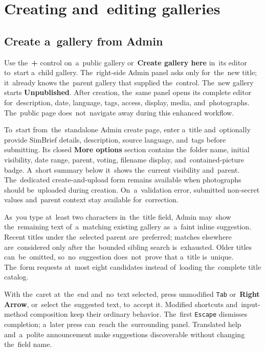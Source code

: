 \documentclass[11pt,a4paper]{article}
\newcommand{\ui}[1]{\textbf{#1}}
\newcommand{\codeword}[1]{\nolinkurl{#1}}
\begin{document}
\section{Creating and~editing galleries}
\label{sec:create-edit-gallery}

\subsection{Create a~gallery from Admin}

Use the~\ui{+} control on~a~public gallery or~\ui{Create gallery here} in~its
editor to~start a~child gallery. The~right-side Admin panel asks only
for~the~new title; it~already knows the~parent gallery that supplied
the~control. The~new gallery starts \ui{Unpublished}. After creation, the~same
panel opens its complete editor for~description, date, language, tags, access,
display, media, and~photographs. The~public page does~not~navigate away during
this enhanced workflow.

To~start from~the~standalone Admin create page, enter a~title and~optionally
provide SimBrief details, description, source language, and~tags before
submitting. Its closed \ui{More options} section contains the~folder name,
initial visibility, date range, parent, voting, filename display,
and~contained-picture badge. A~short summary below it~shows the~current
visibility and~parent. The~dedicated create-and-upload form remains available
when photographs should be~uploaded during creation. On~a~validation error,
submitted non-secret values and~parent context stay available for~correction.

As~you type at~least two characters in~the~title field, Admin may~show
the~remaining text of~a~matching existing gallery as~a~faint inline suggestion.
Recent titles under the~selected parent are~preferred; matches elsewhere
are~considered only after the~bounded sibling search is~exhausted. Older titles
can~be~omitted, so~no~suggestion does~not~prove that a~title is~unique. The~form
requests at~most eight candidates instead of~loading the~complete title catalog.

With the~caret at~the~end and~no~text selected, press unmodified \codeword{Tab}
or~\ui{Right Arrow}, or~select the~suggested text, to~accept it. Modified
shortcuts and~input-method composition keep their ordinary behavior. The~first
\codeword{Escape} dismisses completion; a~later press can~reach the~surrounding
panel. Translated help and~a~polite announcement make suggestions discoverable
without changing the~field name.
\end{document}

